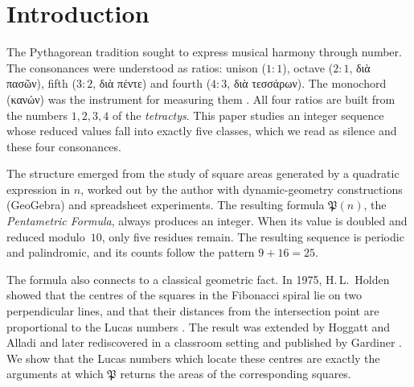 \documentclass[11pt,a4paper]{article}
\newcommand{\gr}[1]{{\greekfont #1}}                 %
\newcommand{\Pent}{\mathfrak{P}}                      %
\theoremstyle{plain}
\theoremstyle{definition}
\theoremstyle{remark}
\begin{document}
\section{Introduction}\label{sec:intro}

The Pythagorean tradition sought to express musical harmony through number. The consonances were understood as ratios: unison ($1:1$), octave ($2:1$, \gr{διὰ πασῶν}), fifth ($3:2$, \gr{διὰ πέντε}) and fourth ($4:3$, \gr{διὰ τεσσάρων}). The monochord (\gr{κανών}) was the instrument for measuring them \cite{Barker1989,Levin1994,Bower1989}. All four ratios are built from the numbers $1,2,3,4$ of the \emph{tetractys}. This paper studies an integer sequence whose reduced values fall into exactly five classes, which we read as silence and these four consonances.

The structure emerged from the study of square areas generated by a quadratic expression in $n$, worked out by the author with dynamic-geometry constructions (GeoGebra) and spreadsheet experiments. The resulting formula $\Pent(n)$, the \emph{Pentametric Formula}, always produces an integer. When its value is doubled and reduced modulo~$10$, only five residues remain. The resulting sequence is periodic and palindromic, and its counts follow the pattern $9+16=25$.

The formula also connects to a classical geometric fact. In 1975, H.\,L.~Holden showed that the centres of the squares in the Fibonacci spiral lie on two perpendicular lines, and that their distances from the intersection point are proportional to the Lucas numbers \cite{Holden1975}. The result was extended by Hoggatt and Alladi \cite{HoggattAlladi1975} and later rediscovered in a classroom setting and published by Gardiner \cite{Gardiner1984}. We show that the Lucas numbers which locate these centres are exactly the arguments at which $\Pent$ returns the areas of the corresponding squares.
\end{document}
